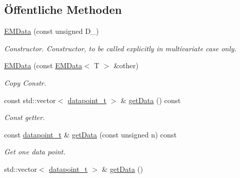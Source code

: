 \subsection*{Öffentliche Methoden}
\begin{DoxyCompactItemize}
\item 
\hyperlink{classCDA_1_1EMData_ae81ba273dcb87842699fcc1f6bd7b62a}{EMData} (const unsigned D\_)
\begin{DoxyCompactList}\small\item\em Constructor. Constructor, to be called explicitly in multivariate case only. \item\end{DoxyCompactList}\item 
\hypertarget{classCDA_1_1EMData_a6199358e23873c8024194c45bd3a53d2}{
\hyperlink{classCDA_1_1EMData_a6199358e23873c8024194c45bd3a53d2}{EMData} (const \hyperlink{classCDA_1_1EMData}{EMData}$<$ T $>$ \&other)}
\label{classCDA_1_1EMData_a6199358e23873c8024194c45bd3a53d2}

\begin{DoxyCompactList}\small\item\em Copy Constr. \item\end{DoxyCompactList}\item 
\hypertarget{classCDA_1_1EMData_aacb5bb5554e8c8fea1b5937c4f922608}{
const std::vector$<$ \hyperlink{classCDA_1_1EMData_a320dfbd3ad13091a99602a140688a05d}{datapoint\_\-t} $>$ \& \hyperlink{classCDA_1_1EMData_aacb5bb5554e8c8fea1b5937c4f922608}{getData} () const }
\label{classCDA_1_1EMData_aacb5bb5554e8c8fea1b5937c4f922608}

\begin{DoxyCompactList}\small\item\em Const getter. \item\end{DoxyCompactList}\item 
const \hyperlink{classCDA_1_1EMData_a320dfbd3ad13091a99602a140688a05d}{datapoint\_\-t} \& \hyperlink{classCDA_1_1EMData_a750090eb9d6bc95f5ca58d502dd9c455}{getData} (const unsigned n) const 
\begin{DoxyCompactList}\small\item\em Get one data point. \item\end{DoxyCompactList}\item 
\hypertarget{classCDA_1_1EMData_ae6d4dd943479cefc24ad1a9696f768b5}{
std::vector$<$ \hyperlink{classCDA_1_1EMData_a320dfbd3ad13091a99602a140688a05d}{datapoint\_\-t} $>$ \& \hyperlink{classCDA_1_1EMData_ae6d4dd943479cefc24ad1a9696f768b5}{getData} ()}
\label{classCDA_1_1EMData_ae6d4dd943479cefc24ad1a9696f768b5}


\end{DoxyCompactItemize}
